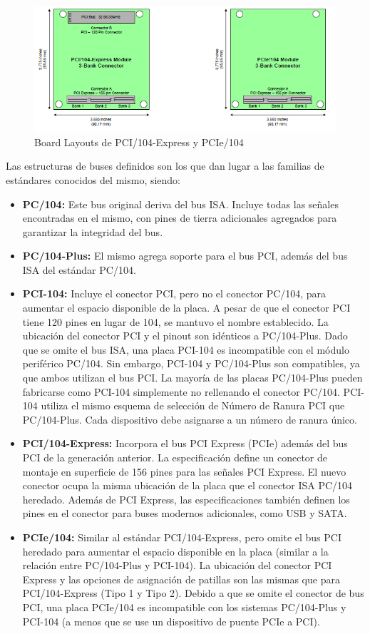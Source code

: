 \begin{figure}[!ht]
    \centering
    \includegraphics[width=\textwidth]{Img/pci104threebank}
    \caption{Board Layouts de PCI/104-Express y PCIe/104}
    \label{fig:pci104threebank}
\end{figure}

Las estructuras de buses definidos son los que dan lugar a las familias de estándares conocidos del mismo, siendo:

\begin{itemize}
    \item \textbf{PC/104:} Este bus original deriva del bus ISA. Incluye todas las señales encontradas en el mismo, con pines de tierra adicionales agregados para garantizar la integridad del bus.
    \item \textbf{PC/104-Plus:} El mismo agrega soporte para el bus PCI, además del bus ISA del estándar PC/104.
    \item \textbf{PCI-104:} Incluye el conector PCI, pero no el conector PC/104, para aumentar el espacio disponible de la placa. A pesar de que el conector PCI tiene 120 pines en lugar de 104, se mantuvo el nombre establecido. La ubicación del conector PCI y el pinout son idénticos a PC/104-Plus. Dado que se omite el bus ISA, una placa PCI-104 es incompatible con el módulo periférico PC/104. Sin embargo, PCI-104 y PC/104-Plus son compatibles, ya que ambos utilizan el bus PCI. La mayoría de las placas PC/104-Plus pueden fabricarse como PCI-104 simplemente no rellenando el conector PC/104. PCI-104 utiliza el mismo esquema de selección de Número de Ranura PCI que PC/104-Plus. Cada dispositivo debe asignarse a un número de ranura único.
    \item \textbf{PCI/104-Express:} Incorpora el bus PCI Express (PCIe) además del bus PCI de la generación anterior. La especificación define un conector de montaje en superficie de 156 pines para las señales PCI Express. El nuevo conector ocupa la misma ubicación de la placa que el conector ISA PC/104 heredado. Además de PCI Express, las especificaciones también definen los pines en el conector para buses modernos adicionales, como USB y SATA.
    \item \textbf{PCIe/104:} Similar al estándar PCI/104-Express, pero omite el bus PCI heredado para aumentar el espacio disponible en la placa (similar a la relación entre PC/104-Plus y PCI-104). La ubicación del conector PCI Express y las opciones de asignación de patillas son las mismas que para PCI/104-Express (Tipo 1 y Tipo 2). Debido a que se omite el conector de bus PCI, una placa PCIe/104 es incompatible con los sistemas PC/104-Plus y PCI-104 (a menos que se use un dispositivo de puente PCIe a PCI).
\end{itemize}

